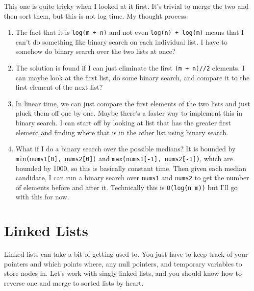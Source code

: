 \documentclass{article}
\begin{document}
  \begin{example}
    This one is quite tricky when I looked at it first. It's trivial to merge the two and then sort them, but this is not log time. My thought process. 
    \begin{enumerate}
      \item The fact that it is \texttt{log(m + n)} and not even \texttt{log(n) + log(m)} means that I can't do something like binary search on each individual list. I have to somehow do binary search over the two lists at once? 
      \item The solution is found if I can just eliminate the first \texttt{(m + n)//2} elements. I can maybe look at the first list, do some binary search, and compare it to the first element of the next list? 
      \item In linear time, we can just compare the first elements of the two lists and just pluck them off one by one. Maybe there's a faster way to implement this in binary search. I can start off by looking at list that has the greater first element and finding where that is in the other list using binary search. 
      \item What if I do a binary search over the possible medians? It is bounded by \texttt{min(nums1[0], nums2[0])} and \texttt{max(nums1[-1], nums2[-1])}, which are bounded by 1000, so this is basically constant time. Then given each median candidate, I can run a binary search over \texttt{nums1} and \texttt{nums2} to get the number of elements before and after it. Technically this is \texttt{O(log(n m))} but I'll go with this for now. 
    \end{enumerate}
  \end{example}

\section{Linked Lists}

  Linked lists can take a bit of getting used to. You just have to keep track of your pointers and which points where, any null pointers, and temporary variables to store nodes in. Let's work with singly linked lists, and you should know how to reverse one and merge to sorted lists by heart. 
\end{document}
